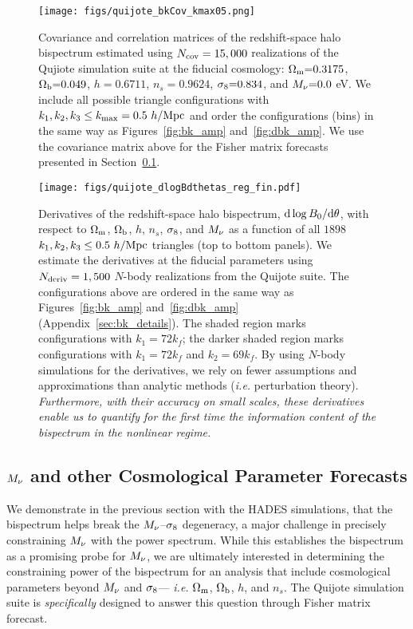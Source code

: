 \begin{figure}
\begin{center}
    \texttt{[image: figs/quijote\_bkCov\_kmax05.png]} 
    \caption{Covariance and correlation matrices of the redshift-space halo bispectrum 
    estimated using $N_{\rm cov} = 15,000$ realizations of the Qujiote simulation suite at 
    the fiducial cosmology: $\Omega_{\rm m}{=}0.3175$, $\Omega_{\rm b}{=}0.049$, $h{=}0.6711$, $n_s{=}0.9624$, $\sigma_8{=}0.834$, 
    and $M_\nu{=}0.0$ eV. We include all possible triangle configurations with 
    $k_1, k_2, k_3 \leq k_{\rm max} = 0.5~h/{\rm Mpc}$ and order the configurations 
    (bins) in the same way as Figures~\ref{fig:bk_amp} and~\ref{fig:dbk_amp}. We 
    use the covariance matrix above for the Fisher matrix forecasts presented in 
    Section~\ref{sec:forecasts}. 
    }
\label{fig:bk_cov}
\end{center}
\end{figure}

\begin{figure}
\begin{center}
    \texttt{[image: figs/quijote\_dlogBdthetas\_reg\_fin.pdf]} 
    \caption{Derivatives of the redshift-space halo bispectrum, ${\rm d}\log B_0 / {\rm d} \theta$,
    with respect to $\Omega_{\rm m}$, $\Omega_{\rm b}$, $h$, $n_s$, $\sigma_8$, and $M_\nu$ as a function 
    of all $1898$ $k_1, k_2, k_3 \leq 0.5~h/{\rm Mpc}$ triangles (top to bottom panels). 
    We estimate the derivatives at the fiducial parameters 
    using $N_{\rm deriv} = 1,500$ $N$-body realizations from the Quijote suite. 
    The configurations above are ordered in the same way as Figures~\ref{fig:bk_amp} 
    and~\ref{fig:dbk_amp} (Appendix~\ref{sec:bk_details}). The shaded region marks 
    configurations with $k_1 = 72k_f$; the darker shaded region marks configurations 
    with $k_1 = 72 k_f$ and $k_2 = 69 k_f$. 
    By using $N$-body simulations for the derivatives, we rely on fewer assumptions 
    and approximations than analytic methods (\emph{i.e.} perturbation theory). 
    \emph{Furthermore, with their accuracy on small scales, these derivatives enable 
    us to quantify for the first time the information content of the bispectrum in 
    the nonlinear regime.}
    }
\label{fig:bk_deriv}
\end{center}
\end{figure}

\subsection{$M_\nu$ and other Cosmological Parameter Forecasts} \label{sec:forecasts}
We demonstrate in the previous section with the HADES simulations, that 
the bispectrum helps break the $M_\nu$--$\sigma_8$ degeneracy, a major 
challenge in precisely constraining $M_\nu$ with the power spectrum. 
While this establishes the bispectrum as a promising probe for $M_\nu$, 
we are ultimately interested in determining the constraining power of the 
bispectrum for an analysis that include cosmological parameters beyond 
$M_\nu$ and $\sigma_8$--- \emph{i.e.} $\Omega_{\rm m}$, $\Omega_{\rm b}$, $h$, and $n_s$. The Quijote 
simulation suite is \emph{specifically} designed to answer this question
through Fisher matrix forecast.

